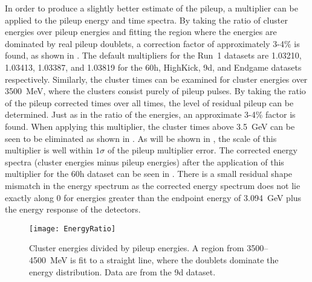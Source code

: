 In order to produce a slightly better estimate of the pileup, a multiplier can be applied to the pileup energy and time spectra. By taking the ratio of cluster energies over pileup energies and fitting the region where the energies are dominated by real pileup doublets, a correction factor of approximately 3-4\% is found, as shown in . The default multipliers for the Run~1 datasets are 1.03210, 1.03413, 1.03387, and 1.03819 for the 60h, HighKick, 9d, and Endgame datasets respectively. Similarly, the cluster times can be examined for cluster energies over \SI{3500}{\MeV}, where the clusters consist purely of pileup pulses. By taking the ratio of the pileup corrected times over all times, the level of residual pileup can be determined. Just as in the ratio of the energies, an approximate 3-4\% factor is found. When applying this multiplier, the cluster times above \SI{3.5}{\GeV} can be seen to be eliminated as shown in . As will be shown in , the scale of this multiplier is well within $1\sigma$ of the pileup multiplier error. The corrected energy spectra (cluster energies minus pileup energies) after the application of this multiplier for the 60h dataset can be seen in . There is a small residual shape mismatch in the energy spectrum as the corrected energy spectrum does not lie exactly along 0 for energies greater than the endpoint energy of \SI{3.094}{\GeV} plus the energy response of the detectors. 


    \begin{figure}
        \centering
        \texttt{[image: EnergyRatio]}
        \caption[Cluster energies divided by pileup energies]{Cluster energies divided by pileup energies. A region from \SI{3500}{}--\SI{4500}{\MeV} is fit to a straight line, where the doublets dominate the energy distribution. Data are from the 9d dataset.}
        \label{fig:EnergyRatio}
    \end{figure}


